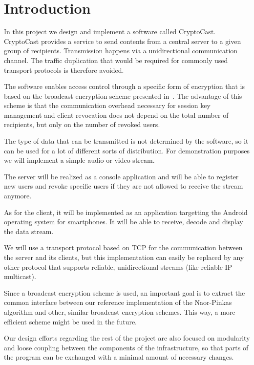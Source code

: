 \documentclass[a4paper,10pt]{scrartcl}
\title{\doctitle}
\author{\authorName}
\date{\today}
\begin{document}

\tableofcontents
\clearpage

\section{Introduction}
In this project we design and implement a software called CryptoCast. CryptoCast provides a service to
send contents from a central server to a given group of recipients. Transmission happens via a unidirectional communication channel.
The traffic duplication that would be required for commonly used transport protocols is therefore avoided.

The software enables access control through a specific form of encryption that is based on the broadcast
encryption scheme presented in~\cite[Section~2.2]{Naor00}. The advantage of this scheme is that the communication
overhead necessary for session key management and client revocation does not depend on the total number of
recipients, but only on the number of revoked users.

The type of data that can be transmitted is not determined by the software, so it can be used for a lot
of different sorts of distribution. For demonstration purposes we will implement a simple audio or video
stream.

The server will be realized as a console application and will be able to register new users and revoke
specific users if they are not allowed to receive the stream anymore.

As for the client, it will be implemented as an application targetting the Android operating system for smartphones.
It will be able to receive, decode and display the data stream.

We will use a transport protocol based on TCP for the communication between the server and its clients,
but this implementation can easily be replaced by any other protocol that supports reliable, unidirectional
streams (like reliable IP multicast).

Since a broadcast encryption scheme is used, an important goal is to extract the common interface between our
reference implementation of the Naor-Pinkas algorithm and other, similar broadcast encryption schemes.
This way, a more efficient scheme might be used in the future.

Our design efforts regarding the rest of the project are also focused on modularity and loose coupling between 
the components of the infrastructure, so that parts of the program can be exchanged with a minimal amount of necessary changes.
\end{document}
